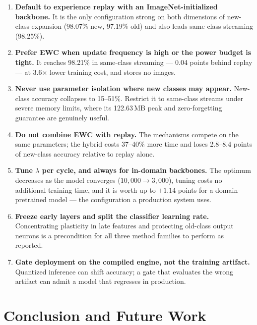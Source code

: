 \documentclass[journal]{IEEEtran}
\begin{document}
\begin{enumerate}
\item \textbf{Default to experience replay with an ImageNet-initialized backbone.}
It is the only configuration strong on both dimensions of new-class expansion
(98.07\% new, 97.19\% old) and also leads same-class streaming (98.25\%).
\item \textbf{Prefer EWC when update frequency is high or the power budget is tight.}
It reaches 98.21\% in same-class streaming --- 0.04 points behind replay --- at
3.6$\times$ lower training cost, and stores no images.
\item \textbf{Never use parameter isolation where new classes may appear.} New-class
accuracy collapses to 15--51\%. Restrict it to same-class streams under severe memory
limits, where its 122.63\,MB peak and zero-forgetting guarantee are genuinely useful.
\item \textbf{Do not combine EWC with replay.} The mechanisms compete on the same
parameters; the hybrid costs 37--40\% more time and loses 2.8--8.4 points of
new-class accuracy relative to replay alone.
\item \textbf{Tune $\lambda$ per cycle, and always for in-domain backbones.} The
optimum decreases as the model converges ($10{,}000 \rightarrow 3{,}000$), tuning
costs no additional training time, and it is worth up to $+1.14$ points for a
domain-pretrained model --- the configuration a production system uses.
\item \textbf{Freeze early layers and split the classifier learning rate.}
Concentrating plasticity in late features and protecting old-class output neurons is a
precondition for all three method families to perform as reported.
\item \textbf{Gate deployment on the compiled engine, not the training artifact.}
Quantized inference can shift accuracy; a gate that evaluates the wrong artifact can
admit a model that regresses in production.
\end{enumerate}

\section{Conclusion and Future Work}
\label{sec:conclusion}
\end{document}
